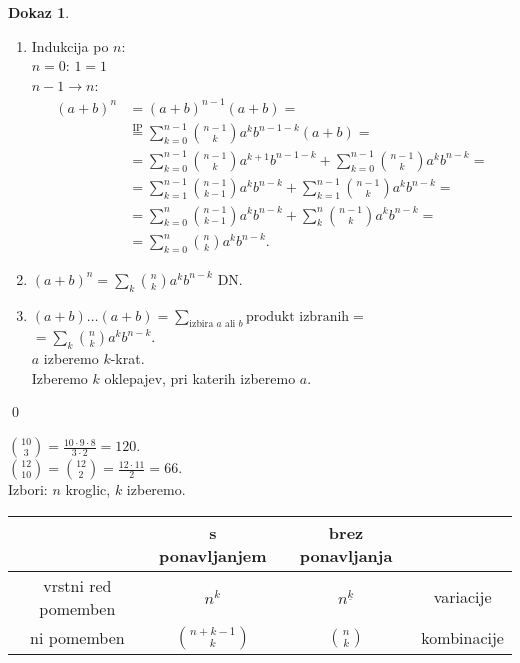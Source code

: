 \documentclass[a4paper, 12pt]{book}
\theoremstyle{definition}
\newtheorem{pro}[counter]{Dokaz}
\theoremstyle{remark}
\begin{document}
\begin{pro} \text{} \\
  \begin{enumerate}[label=D\arabic{*}.]
    \item Indukcija po $n$: \\
      $n=0$: $1=1$ \\
      $n-1 \to n$:
      \begin{align*}
        (a+b)^n &= (a+b)^{n-1}(a+b) = \\
        &\stackrel{\text{IP}}{=} \sum_{k=0}^{n-1} \binom{n-1}{k} a^k b^{n-1-k} (a+b) = \\
        &= \sum_{k=0}^{n-1} \binom{n-1}{k} a^{k+1} b^{n-1-k} + \sum_{k=0}^{n-1} \binom{n-1}{k} a^k b^{n-k} = \\
        &= \sum_{k=1}^{n-1} \binom{n-1}{k-1} a^{k} b^{n-k} + \sum_{k=1}^{n-1} \binom{n-1}{k} a^k b^{n-k} = \\
        &= \sum_{k=0}^{n} \binom{n-1}{k-1} a^{k} b^{n-k} + \sum_{k}^{n} \binom{n-1}{k} a^k b^{n-k} = \\
        &= \sum_{k=0}^{n} \binom{n}{k} a^k b^{n-k}.
      \end{align*}
    \item $(a+b)^n = \sum_k \binom{n}{k} a^k b^{n-k}$ DN.
    \item $(a+b) \dots (a+b) = \sum_{\text{izbira $a$ ali $b$}} \text{produkt izbranih} =$\\
      $= \sum_{k} \binom{n}{k} a^k b^{n-k}$. \\
      $a$ izberemo $k$-krat. \\
      Izberemo $k$ oklepajev, pri katerih izberemo $a$.
  \end{enumerate}
  \qed
\end{pro}
$\binom{10}{3} = \frac{10 \cdot 9 \cdot 8}{3 \cdot 2} = 120$. \\
$\binom{12}{10} = \binom{12}{2} = \frac{12 \cdot 11}{2} = 66$. \\
Izbori: $n$ kroglic, $k$ izberemo. \\
\begin{center}
  \begin{tabular}{c | c | c |c}
    & s ponavljanjem & brez ponavljanja & \\
    \hline
    vrstni red pomemben & $n^k$ & $n^{\underline{k}}$ & variacije \\
    ni pomemben & $\binom{n+k-1}{k}$ & $\binom{n}{k}$ & kombinacije
  \end{tabular}
\end{center}
\end{document}

